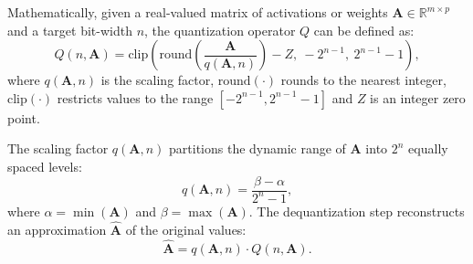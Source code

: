 Mathematically, given a real-valued matrix of activations or weights $\mathbf{A} \in \mathbb{R}^{m \times p}$ and a target bit-width $n$, the quantization operator $Q$ can be defined as:
\begin{equation}
Q(n, \mathbf{A}) = \text{clip}\left( \text{round}\left(\frac{\mathbf{A}}{q(\mathbf{A}, n)}\right)-Z,\ -2^{n-1},\ 2^{n-1}-1 \right),
\label{eq:quantization}
\end{equation}
where $q(\mathbf{A}, n)$ is the scaling factor, $\text{round}(\cdot)$ rounds to the nearest integer, $\text{clip}(\cdot)$ restricts values to the range $[-2^{n-1}, 2^{n-1}-1]$ and $Z$ is an integer zero point.

The scaling factor $q(\mathbf{A}, n)$ partitions the dynamic range of $\mathbf{A}$ into $2^n$ equally spaced levels:
\begin{equation}
q(\mathbf{A}, n) = \frac{\beta - \alpha}{2^n - 1},
\label{eq:scaling}
\end{equation}
where $\alpha = \min(\mathbf{A})$ and $\beta = \max(\mathbf{A})$. The dequantization step reconstructs an approximation $\hat{\mathbf{A}}$ of the original values:
\begin{equation}
\hat{\mathbf{A}} = q(\mathbf{A}, n) \cdot Q(n, \mathbf{A}).
\label{eq:dequantization}
\end{equation}

